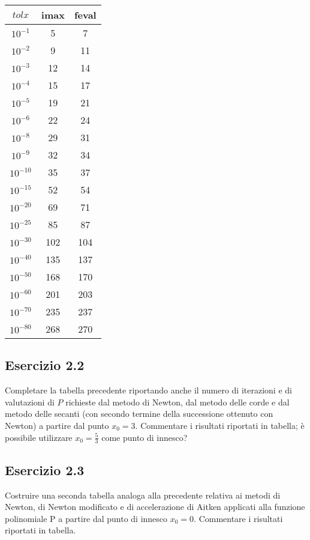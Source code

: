\begin{tabular}{ c | c | c }
$tolx$ & imax & feval \\
\hline
$10^{-1}$ & 5 & 7 \\
$10^{-2}$ & 9 & 11 \\
$10^{-3}$ & 12 & 14 \\
$10^{-4}$ & 15 & 17 \\
$10^{-5}$ & 19 & 21 \\
$10^{-6}$ & 22 & 24 \\
$10^{-8}$ & 29 & 31 \\
$10^{-9}$ & 32 & 34 \\
$10^{-10}$ & 35 & 37 \\
$10^{-15}$ & 52 & 54 \\
$10^{-20}$ & 69 & 71 \\
$10^{-25}$ & 85 & 87 \\
$10^{-30}$ & 102 & 104 \\
$10^{-40}$ & 135 & 137 \\
$10^{-50}$ & 168 & 170 \\
$10^{-60}$ & 201 & 203 \\
$10^{-70}$ & 235 & 237 \\
$10^{-80}$ & 268 & 270 

\end{tabular}


	\subsection{Esercizio 2.2}
	
Completare la tabella precedente riportando anche il numero di iterazioni e di valutazioni di $P$ richieste dal metodo di Newton, dal metodo delle corde e dal metodo delle secanti (con secondo termine della successione ottenuto con Newton) a partire dal punto $x_0=3$. Commentare i risultati riportati in tabella; è possibile utilizzare $x_0 = \frac{5}{3}$ come punto di innesco?

\TODO



	\subsection{Esercizio 2.3}

Costruire una seconda tabella analoga alla precedente relativa ai metodi di Newton, di Newton modificato e di accelerazione di Aitken applicati alla funzione polinomiale P a partire dal punto di innesco $x_0 = 0$. Commentare i risultati riportati in tabella.

